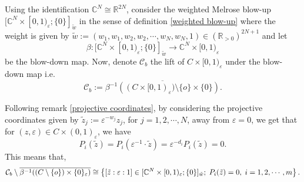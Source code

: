 \documentclass[a4paper,11pt]{article}
\def\C{\mathbb{C}}
\def\R{\mathbb{R}}
\begin{document}
Using the identification $\C^N \cong \R^{2N}$, consider the weighted Melrose blow-up $[\C^N \times [0,1)_\varepsilon ; \{0\}]_{\tilde w}$ in the sense of definition \ref{weighted blow-up} where the weight is given by $\tilde w := (w_1, w_1, w_2, w_2, \cdots, w_N, w_N, 1 ) \in (\R_{>0})^{2N +1}$ and let $$\beta : [\C^N \times [0,1)_\varepsilon ; \{0\}]_{\tilde w} \rightarrow \C^N \times [0,1)_\varepsilon$$ be the blow-down map. Now, denote $\mathcal{C}_b$ the lift of $C \times [0,1)_\varepsilon$ under the blow-down map i.e.
$$
\mathcal{C}_b := \overline{\beta^{-1}\left((C  \times [0,1)_\varepsilon) \setminus \{ o\} \times \{0 \} \right)}. 
$$

Following remark \ref{projective coordinates}, by considering the projective coordinates given by $\tilde z_j := \varepsilon^{- w_j} z_j$, for $j =1,2, \cdots, N$, away from $\varepsilon=0$, we get that for $(z, \varepsilon) \in C \times (0,1)_\varepsilon$, we have
$$ P_i(\tilde z) = P_i(\varepsilon^{-1} \cdot \tilde z) = \varepsilon^{-d_i} P_i(\tilde z) =0.$$
This means that, 
$$\mathcal{C}_b \setminus \overline{\beta^{-1}((C \setminus \{ o\}) \times \{ 0\}_\varepsilon)} \cong \left\{[ \tilde z : \varepsilon : 1] \in [\C^N \times [0,1)_\varepsilon ; \{0\}]_{\tilde w} ; \hspace{0.1cm} P_i(\tilde z) =0, \hspace{0.1cm} i =1,2, \cdots, m \right\}.$$
\end{document}
